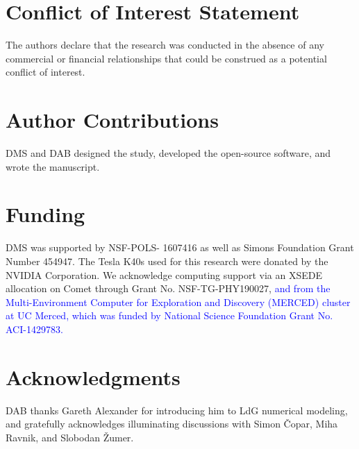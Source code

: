 \documentclass[utf8]{frontiersFPHY} %
\newcommand{\DAB}[1]{\textcolor{blue}{#1}}
\begin{document}
\section*{Conflict of Interest Statement}

The authors declare that the research was conducted in the absence of any commercial or financial relationships that could be construed as a potential conflict of interest.

\section*{Author Contributions}

DMS and DAB designed the study, developed the open-source software, and wrote the manuscript.

\section*{Funding}
DMS was supported by NSF-POLS- 1607416 as well as Simons Foundation Grant Number 454947. The Tesla K40s used for this research were donated by the NVIDIA Corporation. We acknowledge computing support via an XSEDE allocation on Comet through Grant No. NSF-TG-PHY190027, \DAB{and from the Multi-Environment Computer for Exploration and Discovery (MERCED) cluster at UC Merced, which was funded by National Science Foundation Grant No. ACI-1429783.}

\section*{Acknowledgments}
DAB thanks Gareth Alexander for introducing him to LdG numerical modeling, and gratefully acknowledges illuminating discussions with Simon \v{C}opar, Miha Ravnik, and Slobodan \v{Z}umer.

\end{document}
